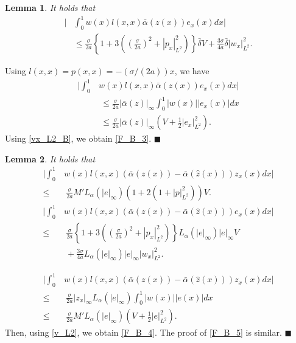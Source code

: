 \documentclass[twocolumn]{autart}
\newtheorem{lemm}{Lemma}
\newenvironment{lemma}{\begin{lemm}}{\hfill \end{lemm}}
\newenvironment{proof}{{\it Proof. }}{\hfill $\blacksquare$ }
\begin{document}
\begin{lemma}
It holds that 
\begin{align}
\bigg|&\int_{0}^{1}w(x)l(x,x)\bar{\alpha}(z(x))e_x(x)dx\bigg| \nonumber \\
&\leq \frac{\sigma}{2a}\left\{1+3\left(\left(\frac{\sigma}{2a}\right)^2+|p_x|_{L^2}^2\right)\right\}\bar{\delta}V+\frac{3\sigma}{4a}\bar{\delta}|w_x|_{L^2}^2. \label{F_B_3}
\end{align}
\hfill  
\end{lemma}
\begin{proof}
Using $l(x,x)=p(x,x)=-(\sigma/(2a))x$, we have 
\begin{align*}
\bigg|\int_{0}^{1}&w(x)l(x,x)\bar{\alpha}(z(x))e_x(x)dx\bigg| \\
&~\leq \frac{\sigma}{2a}|\bar{\alpha}(z)|_{\infty}\int_{0}^{1}|w(x)| |e_x(x)|dx \\
&~\leq \frac{\sigma}{2a}|\bar{\alpha}(z)|_{\infty} \left(V+\frac{1}{2}|e_x|_{L^2}^2\right).
\end{align*}
Using \eqref{vx_L2_B}, we obtain \eqref{F_B_3}. 
\end{proof}

\begin{lemma}
It holds that 
\begin{align}
\bigg|\int_{0}^{1}&w(x)l(x,x)\left(\bar{\alpha}(z(x))-\bar{\alpha}(\hat{z}(x))\right)z_x(x)dx \bigg| \nonumber \\
\leq&~ \frac{\sigma}{2a}M'L_{\alpha}(|e|_{\infty})\left(1+2\left(1+|p|_{L^2}^2\right)\right)V. \label{F_B_4}
\end{align}
\begin{align}
\bigg|\int_{0}^{1}&w(x)l(x,x)\left(\bar{\alpha}(z(x))-\bar{\alpha}(\hat{z}(x))\right)e_x(x)dx \bigg| \nonumber \\
\leq&~ \frac{\sigma}{2a}\left\{1+3\left(\left(\frac{\sigma}{2a}\right)^2+|p_x|_{L^2}^2\right)\right\}L_{\alpha}(|e|_{\infty})|e|_{\infty} V \nonumber \\
&~+\frac{3\sigma}{4a}L_{\alpha}(|e|_{\infty})|e|_{\infty}|w_x|_{L^2}^2. \label{F_B_5}
\end{align}
\end{lemma}
\begin{proof} 
\begin{align*}
\bigg|\int_{0}^{1}&w(x)l(x,x)\left(\bar{\alpha}(z(x))-\bar{\alpha}(\hat{z}(x))\right)z_x(x)dx \bigg| \\
\leq&~\frac{\sigma}{2a}|z_x|_{\infty}L_{\alpha}(|e|_{\infty})\int_{0}^{1}|w(x)||e(x)|dx \\
\leq&~ \frac{\sigma}{2a}M'L_{\alpha}(|e|_{\infty})\left( V+\frac{1}{2}|e|_{L^2}^2\right). 
\end{align*}
Then, using \eqref{v_L2}, we obtain \eqref{F_B_4}. The proof of \eqref{F_B_5} is similar. 
\end{proof}
\end{document}
